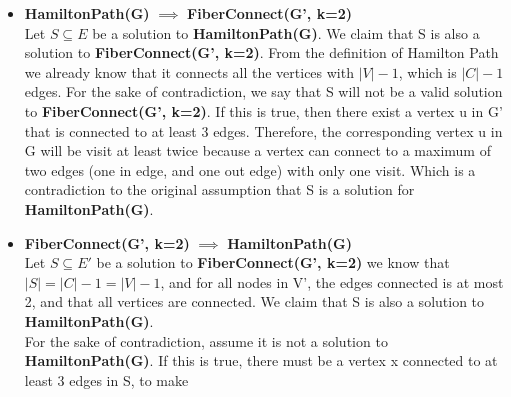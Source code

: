 \documentclass[a4paper]{article}
\begin{document}
\begin{itemize}
 	\item \textbf{HamiltonPath(G)} $\implies$ \textbf{FiberConnect(G', k=2)} \\
		Let $S \subseteq E$ be a solution to \textbf{HamiltonPath(G)}. We claim that
		S is also a solution to \textbf{FiberConnect(G', k=2)}. From the definition of
		Hamilton Path we already know that it connects all the vertices with $|V| - 1$,
		which is $|C| - 1$ edges. For the sake of contradiction, we say that S will not
		be a valid solution to \textbf{FiberConnect(G', k=2)}. If this is true,
		then there exist a vertex u in G' that is connected to at least 3 edges. Therefore,
		the corresponding vertex u in G will be visit at least twice because a vertex can
		connect to a maximum of two edges (one in edge, and one out edge) with only one visit.
		Which is a contradiction to the original assumption that S is a solution for \textbf{HamiltonPath(G)}.
	\item \textbf{FiberConnect(G', k=2)} $\implies$ \textbf{HamiltonPath(G)} \\
		Let $S \subseteq E'$ be a solution to \textbf{FiberConnect(G', k=2)} we know that
		$|S| = |C| - 1 = |V| - 1$, and for all nodes in V', the edges connected is at most 2,
		and that all vertices are connected.
		We claim that S is also a solution to \textbf{HamiltonPath(G)}. \\
		For the sake of contradiction, assume it is not a solution to \textbf{HamiltonPath(G)}.
		If this is true, there must be a vertex x connected to at least 3 edges in S, to make

\end{itemize}
\end{document}
